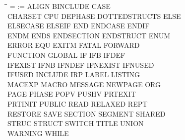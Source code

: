 {\tt\begin{tabbing}
\hspace{3cm}\=\hspace{3cm}\=\hspace{3cm}\=\hspace{3cm}\=\kill
=          \> :=          \> ALIGN       \> BINCLUDE    \> CASE \\
CHARSET    \> CPU         \> DEPHASE     \> DOTTEDSTRUCTS\> ELSE \\
ELSECASE   \> ELSEIF      \> END         \> ENDCASE     \> ENDIF \\
ENDM       \> ENDS        \> ENDSECTION  \> ENDSTRUCT   \> ENUM \\
ERROR      \> EQU         \> EXITM       \> FATAL       \> FORWARD \\
FUNCTION   \> GLOBAL      \> IF          \> IFB         \> IFDEF \\
IFEXIST    \> IFNB        \> IFNDEF      \> IFNEXIST    \> IFNUSED \\
IFUSED     \> INCLUDE     \> IRP         \> LABEL       \> LISTING \\
MACEXP     \> MACRO       \> MESSAGE     \> NEWPAGE     \> ORG \\
PAGE       \> PHASE       \> POPV        \> PUSHV       \> PRTEXIT \\
PRTINIT    \> PUBLIC      \> READ        \> RELAXED     \> REPT \\
RESTORE    \> SAVE        \> SECTION     \> SEGMENT     \> SHARED \\
STRUC      \> STRUCT      \> SWITCH      \> TITLE       \> UNION \\
WARNING    \> WHILE \\ 
\end{tabbing}}
